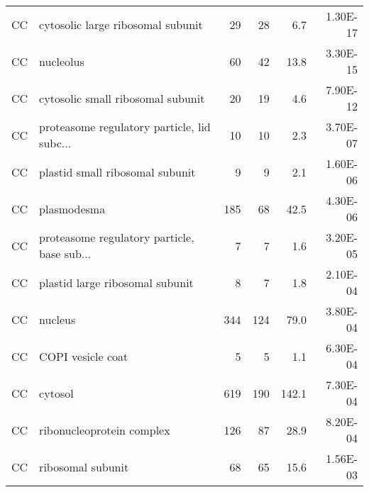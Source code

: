 \documentclass[11pt,letter]{article}\usepackage[]{graphicx}\usepackage[]{color}
\begin{document}
\begin{table}
\begin{tabular}{llrrrr}
   \hline
CC & cytosolic large ribosomal subunit & 29 & 28 & 6.7 & 1.30E-17 \\ 
  CC & nucleolus & 60 & 42 & 13.8 & 3.30E-15 \\ 
  CC & cytosolic small ribosomal subunit & 20 & 19 & 4.6 & 7.90E-12 \\ 
  CC & proteasome regulatory particle, lid subc... & 10 & 10 & 2.3 & 3.70E-07 \\ 
  CC & plastid small ribosomal subunit & 9 & 9 & 2.1 & 1.60E-06 \\ 
  CC & plasmodesma & 185 & 68 & 42.5 & 4.30E-06 \\ 
  CC & proteasome regulatory particle, base sub... & 7 & 7 & 1.6 & 3.20E-05 \\ 
  CC & plastid large ribosomal subunit & 8 & 7 & 1.8 & 2.10E-04 \\ 
  CC & nucleus & 344 & 124 & 79.0 & 3.80E-04 \\ 
  CC & COPI vesicle coat & 5 & 5 & 1.1 & 6.30E-04 \\ 
  CC & cytosol & 619 & 190 & 142.1 & 7.30E-04 \\ 
  CC & ribonucleoprotein complex & 126 & 87 & 28.9 & 8.20E-04 \\ 
  CC & ribosomal subunit & 68 & 65 & 15.6 & 1.56E-03 \\ 
   \hline
\end{tabular}

\label{tbl:gsea-unstable}
\end{table}

\end{document}
